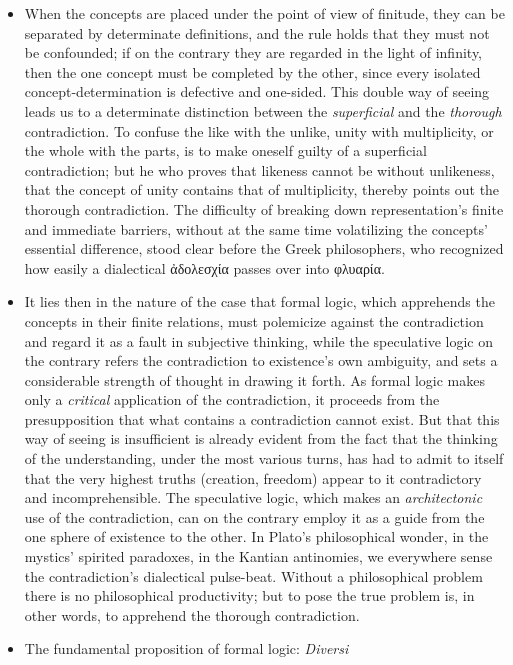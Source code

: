 \documentclass[12pt]{book}
\begin{document}
\begin{itemize}
\item[a)] When the concepts are placed under the point of view of finitude,
  they can be separated by determinate definitions, and the rule holds that
  they must not be confounded; if on the contrary they are regarded in the
  light of infinity, then the one concept must be completed by the other,
  since every isolated concept-determination is defective and one-sided.
  This double way of seeing leads us to a determinate distinction between
  the \emph{superficial} and the \emph{thorough} contradiction. To confuse
  the like with the unlike, unity with multiplicity, or the whole with the
  parts, is to make oneself guilty of a superficial contradiction; but he
  who proves that likeness cannot be without unlikeness, that the concept of
  unity contains that of multiplicity, thereby points out the thorough
  contradiction. The difficulty of breaking down representation's finite and
  immediate barriers, without at the same time volatilizing the concepts'
  essential difference, stood clear before the Greek philosophers, who
  recognized how easily a dialectical ἀδολεσχία passes over into φλυαρία.
\item[b)] It lies then in the nature of the case that formal logic, which
  apprehends the concepts in their finite relations, must polemicize against
  the contradiction and regard it as a fault in subjective thinking, while
  the speculative logic on the contrary refers the contradiction to
  existence's own ambiguity, and sets a considerable strength of thought in
  drawing it forth. As formal logic makes only a \emph{critical} application
  of the contradiction, it proceeds from the presupposition that what
  contains a contradiction cannot exist. But that this way of seeing is
  insufficient is already evident from the fact that the thinking of the
  understanding, under the most various turns, has had to admit to itself
  that the very highest truths (creation, freedom) appear to it
  contradictory and incomprehensible. The speculative logic, which makes an
  \emph{architectonic} use of the contradiction, can on the contrary employ
  it as a guide from the one sphere of existence to the other. In Plato's
  philosophical wonder, in the mystics' spirited paradoxes, in the Kantian
  antinomies, we everywhere sense the contradiction's dialectical
  pulse-beat. Without a philosophical problem there is no philosophical
  productivity; but to pose the true problem is, in other words, to
  apprehend the thorough contradiction.
\item[c)] The fundamental proposition of formal logic: \textit{Diversi
}
\end{itemize}
\end{document}

